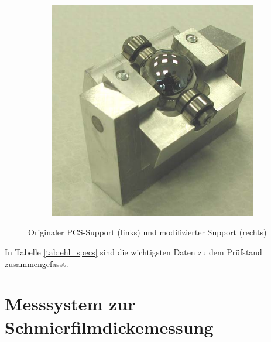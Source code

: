 \begin{figure}[htb]
\begin{subfigure}[b]{0.3\textwidth}
        \includegraphics[width=\textwidth]{./images/kugel-support_wittek.png}
    \end{subfigure}
    \caption{Originaler PCS-Support (links) und modifizierter Support (rechts) \cite{wittek_2007}}
    \label{fig:kugel_support}
\end{figure}
%

In Tabelle \ref{tab:ehl_specs} sind die wichtigsten Daten zu dem Prüfstand zusammengefasst.


\section{Messsystem zur Schmierfilmdickemessung}
\label{sec:messsystem_zur_schmierfilmdickemessung}

